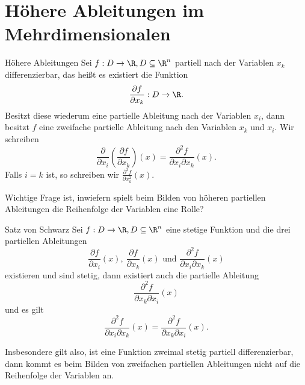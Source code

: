 \section{Höhere Ableitungen im Mehrdimensionalen}
\begin{definition}{Höhere Ableitungen}
	Sei $f:D\rightarrow\R,D\subseteq\R^n$ partiell nach der Variablen $x_k$ differenzierbar, das heißt es existiert die Funktion
	\begin{equation*}
		\frac{\partial f}{\partial x_k}:D\rightarrow \R.
	\end{equation*}
	Besitzt diese wiederum eine partielle Ableitung nach der Variablen $x_i$, dann besitzt $f$ eine zweifache partielle Ableitung nach den Variablen $x_k$ und $x_i$. Wir schreiben
	\begin{equation*}
		\frac{\partial}{\partial x_i}\left(\frac{\partial f}{\partial x_k}\right)(x)=\frac{\partial^2 f}{\partial x_i\partial x_k}(x).
	\end{equation*}
	Falls $i=k$ ist, so schreiben wir $\frac{\partial^2 f}{\partial x_k^2}(x)$.
\end{definition}
Wichtige Frage ist, inwiefern spielt beim Bilden von höheren partiellen Ableitungen die Reihenfolge der Variablen eine Rolle?
\begin{satz}{Satz von Schwarz}
	Sei $f:D\rightarrow\R,D\subseteq\R^n$ eine stetige Funktion und die drei partiellen Ableitungen
	\begin{equation*}
		\frac{\partial f}{\partial x_i}(x),\ \frac{\partial f}{\partial x_k}(x) \text{ und } \frac{\partial^2 f}{\partial x_i\partial x_k}(x)
	\end{equation*}
	existieren und sind stetig, dann existiert auch die partielle Ableitung
	\begin{equation*}
		\frac{\partial^2 f}{\partial x_k\partial x_i}(x)
	\end{equation*}
	und es gilt
	\begin{equation*}
		\frac{\partial^2 f}{\partial x_i\partial x_k}(x)=\frac{\partial^2 f}{\partial x_k\partial x_i}(x).
	\end{equation*}
\end{satz}
Insbesondere gilt also, ist eine Funktion zweimal stetig partiell differenzierbar, dann kommt es beim Bilden von zweifachen partiellen Ableitungen nicht auf die Reihenfolge der Variablen an.
